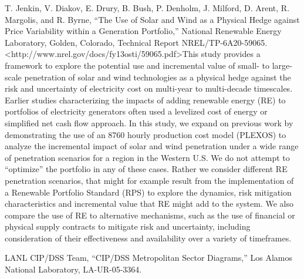 \documentclass[]{article}
\begin{document}
T. Jenkin, V. Diakov, E. Drury, B. Bush, P. Denholm, J. Milford, D.
Arent, R. Margolis, and R. Byrne, ``The Use of Solar and Wind as a
Physical Hedge against Price Variability within a Generation
Portfolio,'' National Renewable Energy Laboratory, Golden, Colorado,
Technical Report NREL/TP-6A20-59065.
\textless{}http://www.nrel.gov/docs/fy13osti/59065.pdf\textgreater{}This
study provides a framework to explore the potential use and incremental
value of small- to large-scale penetration of solar and wind
technologies as a physical hedge against the risk and uncertainty of
electricity cost on multi-year to multi-decade timescales. Earlier
studies characterizing the impacts of adding renewable energy (RE) to
portfolios of electricity generators often used a levelized cost of
energy or simplified net cash flow approach. In this study, we expand on
previous work by demonstrating the use of an 8760 hourly production cost
model (PLEXOS) to analyze the incremental impact of solar and wind
penetration under a wide range of penetration scenarios for a region in
the Western U.S. We do not attempt to ``optimize'' the portfolio in any
of these cases. Rather we consider different RE penetration scenarios,
that might for example result from the implementation of a Renewable
Portfolio Standard (RPS) to explore the dynamics, risk mitigation
characteristics and incremental value that RE might add to the system.
We also compare the use of RE to alternative mechanisms, such as the use
of financial or physical supply contracts to mitigate risk and
uncertainty, including consideration of their effectiveness and
availability over a variety of timeframes.

LANL CIP/DSS Team, ``CIP/DSS Metropolitan Sector Diagrams,'' Los Alamos
National Laboratory, LA-UR-05-3364.
\end{document}
